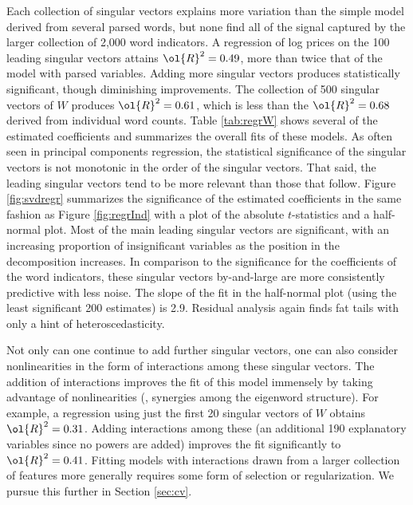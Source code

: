 \documentclass[12pt]{article}
\begin{document}
Each collection of singular vectors explains more variation than the simple model derived from several parsed words, but none find all of the signal captured by the larger collection of 2,000 word indicators.  A regression of log prices on the 100 leading singular vectors attains $\ol{R}^2 = 0.49$, more than twice that of the model with parsed variables.  Adding more singular vectors produces statistically significant, though diminishing improvements.  The collection of 500 singular vectors of $W$ produces $\ol{R}^2 = 0.61$, which is less than the $\ol{R}^2 = 0.68$ derived from individual word counts.  Table \ref{tab:regrW}  shows several of the estimated coefficients and summarizes the overall fits of these models.  As often seen in principal components regression, the statistical significance of the singular vectors is not monotonic in the order of the singular vectors. That said, the leading singular vectors tend to be more relevant than those that follow. Figure \ref{fig:svdregr} summarizes the significance of the estimated coefficients in the same fashion as Figure \ref{fig:regrInd} with a plot of the absolute $t$-statistics and a half-normal plot. Most of the main leading singular vectors are significant, with an increasing proportion of insignificant variables as the position in the decomposition increases.  In comparison to the significance for the coefficients of the word indicators, these singular vectors by-and-large are more consistently predictive with less noise.  The slope of the fit in the half-normal plot (using the least significant 200 estimates) is 2.9.  Residual analysis again finds fat tails with only a hint of heteroscedasticity.
 
 
 Not only can one continue to add further singular vectors, one can also consider nonlinearities in the form of interactions among these singular vectors.  The addition of interactions improves the fit of this model immensely by taking advantage of nonlinearities (\ie, synergies among the eigenword structure).  For example, a regression using just the first 20 singular vectors of $W$ obtains $\ol{R}^2 = 0.31$.  Adding interactions among these (an additional 190 explanatory variables since no powers are added) improves the fit significantly to $\ol{R}^2 = 0.41$.  Fitting models with interactions drawn from a larger collection of features more generally requires some form of selection or regularization.  We pursue this further in Section \ref{sec:cv}.
 
\end{document}
